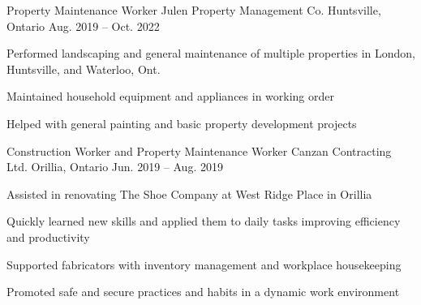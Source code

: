 \begin{cventries}
  \vspace{-\baselineskip}

  \cventry
    {Property Maintenance Worker} %
    {Julen Property Management Co.} %
    {Huntsville, Ontario} %
    {Aug. 2019 -- Oct. 2022} %
    {
      \begin{cvitems} %
        \item{Performed landscaping and general maintenance of multiple properties in London, Huntsville, and Waterloo, Ont.}
        \item{Maintained household equipment and appliances in working order}
        \item{Helped with general painting and basic property development projects}
      \end{cvitems}
    }

    \vspace{0.5mm}
  \cventry
    {Construction Worker and Property Maintenance Worker} %
    {Canzan Contracting Ltd.} %
    {Orillia, Ontario} %
    {Jun. 2019 -- Aug. 2019} %
    {
      \begin{cvitems} %
        \item{Assisted in renovating The Shoe Company at West Ridge Place in Orillia}
        \item{Quickly learned new skills and applied them to daily tasks improving efficiency and productivity}
        \item{Supported fabricators with inventory management and workplace housekeeping}
        \item{Promoted safe and secure practices and habits in a dynamic work environment}
      \end{cvitems}
    }
\end{cventries}
